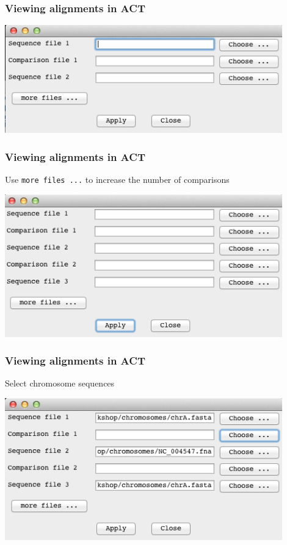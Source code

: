 \documentclass[table]{beamer}
\begin{document}
    \begin{frame}
      \frametitle{Viewing alignments in ACT}    
      \begin{center}
        \includegraphics[width=0.9\textwidth]{images/act_wgs2}     
      \end{center}
    \end{frame} 

    \begin{frame}
      \frametitle{Viewing alignments in ACT}    
      Use \texttt{more files ...} to increase the number of comparisons
      \begin{center}
        \includegraphics[width=0.9\textwidth]{images/act_wgs3}     
      \end{center}
    \end{frame} 

    \begin{frame}
      \frametitle{Viewing alignments in ACT}    
      Select chromosome sequences
      \begin{center}
        \includegraphics[width=0.9\textwidth]{images/act_wgs4}     
      \end{center}
    \end{frame} 
\end{document}
